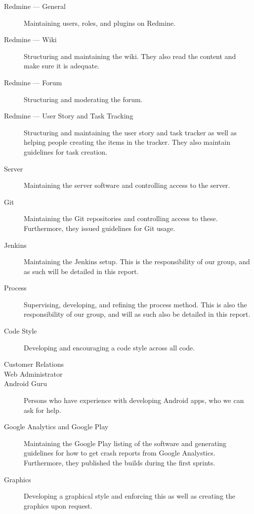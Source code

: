 \begin{description}
  \item[Redmine --- General] Maintaining users, roles, and plugins on Redmine.
  \item[Redmine --- Wiki] Structuring and maintaining the wiki. They also read the content and make sure it is adequate.
  \item[Redmine --- Forum] Structuring and moderating the forum.
  \item[Redmine --- User Story and Task Tracking] Structuring and maintaining the user story and task tracker as well as helping people creating the items in the tracker. They also maintain guidelines for task creation.
  \item[Server] Maintaining the server software and controlling access to the server.
  \item[Git] Maintaining the Git repositories and controlling access to these. Furthermore, they issued guidelines for Git usage.
  \item[Jenkins] Maintaining the Jenkins setup. This is the responsibility of our group, and as such will be detailed in this report.
  \item[Process] Supervising, developing, and refining the process method. This is also the responsibility of our group, and will as such also be detailed in this report.
  \item[Code Style] Developing and encouraging a code style across all code.
  \item[Customer Relations] 
  \item[Web Administrator] 
  \item[Android Guru] Persons who have experience with developing Android apps, who we can ask for help.
  \item[Google Analytics and Google Play] Maintaining the Google Play listing of the software and generating guidelines for how to get crash reports from Google Analystics. Furthermore, they published the builds during the first sprints.
  \item[Graphics] Developing a graphical style and enforcing this as well as creating the graphics upon request.
\end{description}